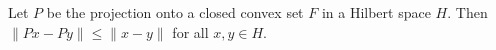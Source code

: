 Let $P$ be the projection onto a closed convex set $F$ in a Hilbert space $H$. Then $\|Px - Py\| \leq \|x - y\|$ for all $x, y \in H$.
